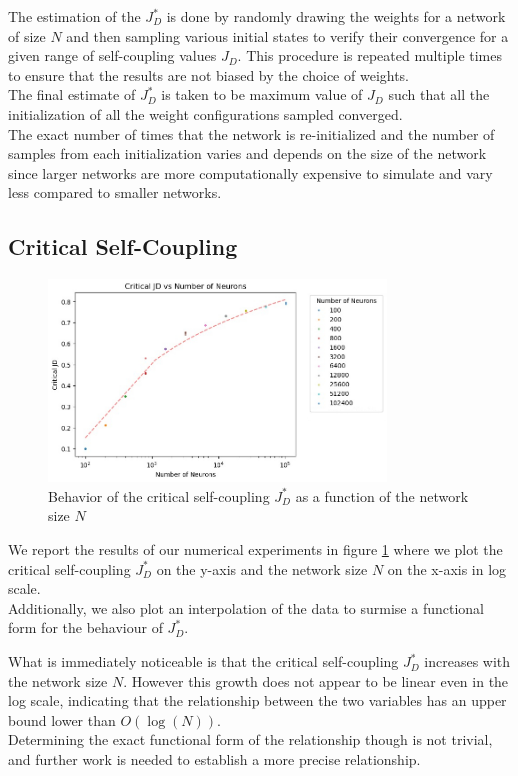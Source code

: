 \documentclass[a4paper,12pt]{report}
\begin{document}
The estimation of the $J^*_D$ is done by randomly drawing the weights for a network of
size $N$ and then sampling various initial states to verify their convergence for a given
range of self-coupling values $J_D$. This procedure is repeated multiple times to ensure that 
the results are not biased by the choice of weights. \\
The final estimate of $J^*_D$ is taken to be maximum value of $J_D$ such that all the 
initialization of all the weight configurations sampled converged.\\
The exact number of times that the network is re-initialized and the number of samples
from each initialization varies and depends on the size of the network since larger
networks are more computationally expensive to simulate and vary less compared to smaller
networks.

\subsection*{Critical Self-Coupling}

\begin{figure}[h!]
  \centering
  \includegraphics[width=0.8\textwidth]{pictures/Critical_JD_vs_Neurons.jpg}
  \caption{Behavior of the critical self-coupling $J^*_D$ as a function of the 
  network size $N$}
  \label{fig:critical_JD_vs_Neurons}
\end{figure}

We report the results of our numerical experiments in figure 
\ref{fig:critical_JD_vs_Neurons} where we plot the critical self-coupling
$J^*_D$ on the y-axis and the network size $N$ on the x-axis in log scale. \\
Additionally, we also plot an interpolation of the data to surmise a functional form
for the behaviour of $J^*_D$.
\vspace*{0.5em}

What is immediately noticeable is that the critical self-coupling $J^*_D$ increases 
with the network size $N$. However this growth does not appear to be linear even in 
the log scale, indicating that the relationship between the two variables has an upper
bound lower than $O\left(\log\left(N\right)\right)$.\\
Determining the exact functional form of the relationship though is not trivial, and 
further work is needed to establish a more precise relationship.
\end{document}
